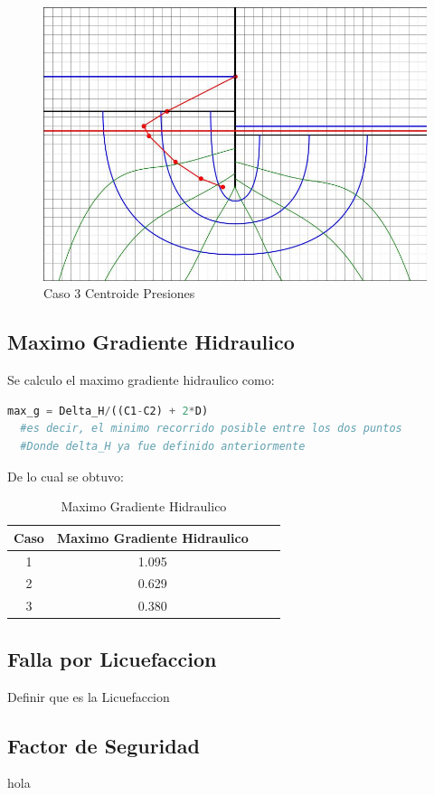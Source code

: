 \documentclass{article}
\begin{document}
\begin{figure}[H]
\begin{minipage}{0.32\textwidth}
      \includegraphics[width=\textwidth]{FOTOS/caso_3_centroide_y.jpg}
      \caption{Caso 3 Centroide Presiones}
  \end{minipage}
\end{figure}

\subsection{Maximo Gradiente Hidraulico}

Se calculo el maximo gradiente hidraulico como:

\begin{lstlisting}[language=Python]
  max_g = Delta_H/((C1-C2) + 2*D)
  #es decir, el minimo recorrido posible entre los dos puntos
  #Donde delta_H ya fue definido anteriormente
\end{lstlisting}

De lo cual se obtuvo:

\begin{table}[H]
  \centering
  \begin{tabular}{|c|c|c|c|}
    \hline
    Caso & Maximo Gradiente Hidraulico \\
    \hline
    1 & 1.095 \\ \hline
    2 & 0.629 \\ \hline
    3 & 0.380 \\
    \hline
  \end{tabular}
  \caption{Maximo Gradiente Hidraulico}
\end{table}

\subsection{Falla por Licuefaccion}

Definir que es la Licuefaccion

\subsection{Factor de Seguridad}

hola
\end{document}
